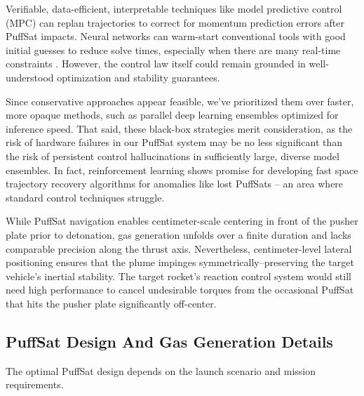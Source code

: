 \documentclass{article}
\begin{document}
Verifiable, data-efficient, interpretable techniques like model predictive control (MPC) can replan trajectories to correct for momentum prediction errors after PuffSat impacts.  Neural networks can  warm-start conventional tools with good initial guesses to reduce solve times, \cite{guffanti2024transformerstrajectoryoptimizationapplication} especially when there are many real-time constraints  \cite{briden_constraint}.  However, the control law itself could remain grounded in well-understood optimization and stability guarantees.     

Since conservative approaches appear feasible, we've prioritized them over faster, more opaque methods, such as parallel deep learning ensembles optimized for inference speed. That said, these black-box strategies merit consideration, as the risk of hardware failures in our PuffSat system may be no less significant than the risk of persistent control hallucinations in sufficiently large, diverse model ensembles.  In fact, reinforcement learning shows promise for developing fast space trajectory recovery algorithms for anomalies like lost PuffSats \cite{zavoli2021reinforcement} -- an area where standard control techniques struggle.  

While PuffSat navigation enables centimeter-scale centering in front of the pusher plate prior to detonation, gas generation unfolds over a finite duration and lacks comparable precision along the thrust axis. Nevertheless, centimeter-level lateral positioning ensures that the plume impinges symmetrically--preserving the target vehicle’s inertial stability.  The target rocket's reaction control system would still need high performance to cancel undesirable torques from the occasional PuffSat that hits the pusher plate significantly off-center.

\subsection{PuffSat Design And Gas Generation Details}\label{sec:puffsat_design}
The optimal PuffSat design depends on the launch scenario and mission requirements.  
\end{document}
